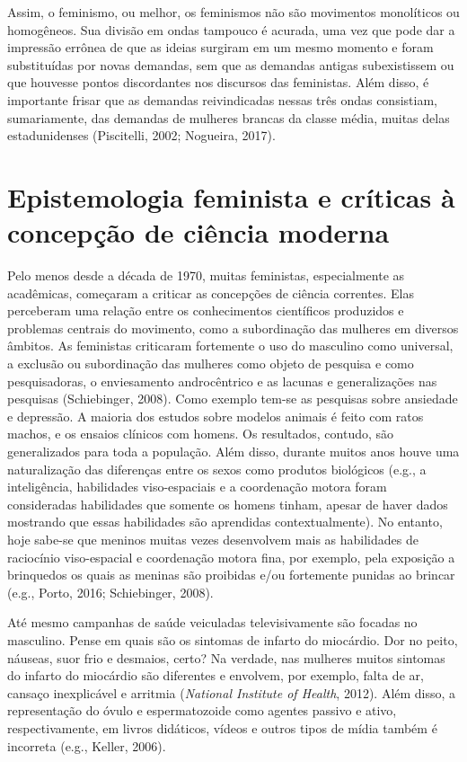 Assim, o feminismo, ou melhor, os feminismos não são movimentos monolíticos ou homogêneos. Sua divisão em ondas tampouco é acurada, uma vez que pode dar a impressão errônea de que as ideias surgiram em um mesmo momento e foram substituídas por novas demandas, sem que as demandas antigas subexistissem ou que houvesse pontos discordantes nos discursos das feministas. Além disso, é importante frisar que as demandas reivindicadas nessas três ondas consistiam, sumariamente, das demandas de mulheres brancas da classe média, muitas delas estadunidenses (Piscitelli, 2002; Nogueira, 2017).

\section{Epistemologia feminista e críticas à concepção de ciência moderna}

Pelo menos desde a década de 1970, muitas feministas, especialmente as acadêmicas, começaram a criticar as concepções de ciência correntes. Elas perceberam uma relação entre os conhecimentos científicos produzidos e problemas centrais do movimento, como a subordinação das mulheres em diversos âmbitos. As feministas criticaram fortemente o uso do masculino como universal, a exclusão ou subordinação das mulheres como objeto de pesquisa e como pesquisadoras, o enviesamento androcêntrico e as lacunas e generalizações nas pesquisas (Schiebinger, 2008). Como exemplo tem-se as pesquisas sobre ansiedade e depressão. A maioria dos estudos sobre modelos animais é feito com ratos machos, e os ensaios clínicos com homens. Os resultados, contudo, são generalizados para toda a população. Além disso, durante muitos anos houve uma naturalização das diferenças entre os sexos como produtos biológicos (e.g., a inteligência, habilidades viso-espaciais e a coordenação motora foram consideradas habilidades que somente os homens tinham, apesar de haver dados mostrando que essas habilidades são aprendidas contextualmente). No entanto, hoje sabe-se que meninos muitas vezes desenvolvem mais as habilidades de raciocínio viso-espacial e coordenação motora fina, por exemplo, pela exposição a brinquedos os quais as meninas são proibidas e/ou fortemente punidas ao brincar (e.g., Porto, 2016; Schiebinger, 2008).

Até mesmo campanhas de saúde veiculadas televisivamente são focadas no masculino. Pense em quais são os sintomas de infarto do miocárdio. Dor no peito, náuseas, suor frio e desmaios, certo? Na verdade, nas mulheres muitos sintomas do infarto do miocárdio são diferentes e envolvem, por exemplo, falta de ar, cansaço inexplicável e arritmia (\textit{National Institute of Health}, 2012). Além disso, a representação do óvulo e espermatozoide como agentes passivo e ativo, respectivamente, em livros didáticos, vídeos e outros tipos de mídia também é incorreta (e.g., Keller, 2006).

